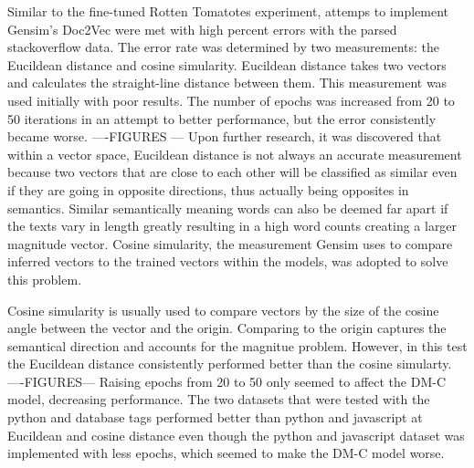 Similar to the fine-tuned Rotten Tomatotes experiment, attemps to implement Gensim's Doc2Vec were met with high percent errors with the parsed stackoverflow data. The error rate was determined by two measurements: the Eucildean distance and cosine simularity. Eucildean distance takes two vectors and calculates the straight-line distance between them. This measurement was used initially with poor results. The number of epochs was increased from 20 to 50 iterations in an attempt to better performance, but the error consistently became worse. ----FIGURES --- Upon further research, it was discovered that within a vector space, Eucildean distance is not always an accurate measurement because two vectors that are close to each other will be classified as similar even if they are going in opposite directions, thus actually being opposites in semantics. Similar semantically meaning words can also be deemed far apart if the texts vary in length greatly resulting in a high word counts creating a larger magnitude vector. Cosine simularity, the measurement Gensim uses to compare inferred vectors to the trained vectors within the models, was adopted to solve this problem.

Cosine simularity is usually used to compare vectors by the size of the cosine angle between the vector and the origin. Comparing to the origin captures the semantical direction and accounts for the magnitue problem. However, in this test the Eucildean distance consistently performed better than the cosine simularty.  ----FIGURES---  Raising epochs from 20 to 50 only seemed to affect the DM-C model, decreasing performance. The two datasets that were tested with the python and database tags performed better than python and javascript at Eucildean and cosine distance even though the python and javascript dataset was implemented with less epochs, which seemed to make the DM-C model worse. 







%
